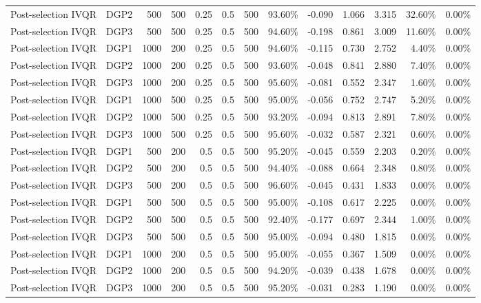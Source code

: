 \begin{landscape}
\begin{longtable}{llrrrrrrrrrrr}
Post-selection IVQR & DGP2 & 500 & 500 & 0.25 & 0.5 & 500 & 93.60\% & -0.090 & 1.066 & 3.315 & 32.60\% & 0.00\% \\
Post-selection IVQR & DGP3 & 500 & 500 & 0.25 & 0.5 & 500 & 94.60\% & -0.198 & 0.861 & 3.009 & 11.60\% & 0.00\% \\
Post-selection IVQR & DGP1 & 1000 & 200 & 0.25 & 0.5 & 500 & 94.60\% & -0.115 & 0.730 & 2.752 & 4.40\% & 0.00\% \\
Post-selection IVQR & DGP2 & 1000 & 200 & 0.25 & 0.5 & 500 & 93.60\% & -0.048 & 0.841 & 2.880 & 7.40\% & 0.00\% \\
Post-selection IVQR & DGP3 & 1000 & 200 & 0.25 & 0.5 & 500 & 95.60\% & -0.081 & 0.552 & 2.347 & 1.60\% & 0.00\% \\
Post-selection IVQR & DGP1 & 1000 & 500 & 0.25 & 0.5 & 500 & 95.00\% & -0.056 & 0.752 & 2.747 & 5.20\% & 0.00\% \\
Post-selection IVQR & DGP2 & 1000 & 500 & 0.25 & 0.5 & 500 & 93.20\% & -0.094 & 0.813 & 2.891 & 7.80\% & 0.00\% \\
Post-selection IVQR & DGP3 & 1000 & 500 & 0.25 & 0.5 & 500 & 95.60\% & -0.032 & 0.587 & 2.321 & 0.60\% & 0.00\% \\
Post-selection IVQR & DGP1 & 500 & 200 & 0.5 & 0.5 & 500 & 95.20\% & -0.045 & 0.559 & 2.203 & 0.20\% & 0.00\% \\
Post-selection IVQR & DGP2 & 500 & 200 & 0.5 & 0.5 & 500 & 94.40\% & -0.088 & 0.664 & 2.348 & 0.80\% & 0.00\% \\
Post-selection IVQR & DGP3 & 500 & 200 & 0.5 & 0.5 & 500 & 96.60\% & -0.045 & 0.431 & 1.833 & 0.00\% & 0.00\% \\
Post-selection IVQR & DGP1 & 500 & 500 & 0.5 & 0.5 & 500 & 95.00\% & -0.108 & 0.617 & 2.225 & 0.00\% & 0.00\% \\
Post-selection IVQR & DGP2 & 500 & 500 & 0.5 & 0.5 & 500 & 92.40\% & -0.177 & 0.697 & 2.344 & 1.00\% & 0.00\% \\
Post-selection IVQR & DGP3 & 500 & 500 & 0.5 & 0.5 & 500 & 95.00\% & -0.094 & 0.480 & 1.815 & 0.00\% & 0.00\% \\
Post-selection IVQR & DGP1 & 1000 & 200 & 0.5 & 0.5 & 500 & 95.00\% & -0.055 & 0.367 & 1.509 & 0.00\% & 0.00\% \\
Post-selection IVQR & DGP2 & 1000 & 200 & 0.5 & 0.5 & 500 & 94.20\% & -0.039 & 0.438 & 1.678 & 0.00\% & 0.00\% \\
Post-selection IVQR & DGP3 & 1000 & 200 & 0.5 & 0.5 & 500 & 95.20\% & -0.031 & 0.283 & 1.190 & 0.00\% & 0.00\% \\

\end{longtable}
\end{landscape}
